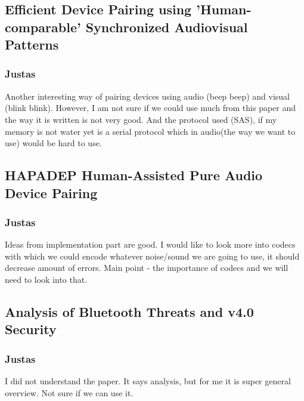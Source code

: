 \documentclass[12pt]{article}
\begin{document}
\subsection{Efficient Device Pairing using 'Human-comparable' Synchronized Audiovisual Patterns}
\label{sub:Efficient Device Pairing using 'Human-comparable' Synchronized Audiovisual Patterns}

\subsubsection{Justas}
\label{subs:Justas}

Another interesting way of pairing devices using audio (beep beep) and visual (blink blink). However, I am not sure if we could use much from this paper and the way it is written is not very good. And the protocol used (SAS), if my memory is not water yet is a serial protocol which in audio(the way we want to use) would be hard to use.

\subsection{HAPADEP Human-Assisted Pure Audio Device Pairing}
\label{sub:HAPADEP Human-Assisted Pure Audio Device Pairing}

\subsubsection{Justas}
\label{subs:Justas}

Ideas from implementation part are good. I would like to look more into codecs with which we could encode whatever noise/sound we are going to use, it should decrease amount of errors. Main point - the importance of codecs and we will need to look into that.

\subsection{Analysis of Bluetooth Threats and v4.0 Security}
\label{sub:Analysis of Bluetooth Threats and v4.0 Security}

\subsubsection{Justas}
\label{subs:Justas}

I did not understand the paper. It says analysis, but for me it is super general overview. Not sure if we can use it.
\end{document}
